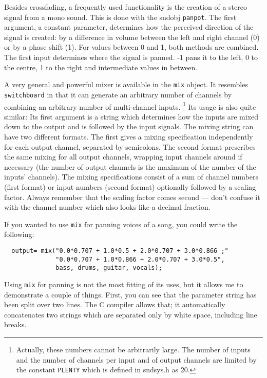 \documentclass{article}
\def\bv{\begin{verbatim}}
\begin{document}
Besides crossfading, a frequently used functionality is the creation of a
stereo signal from a mono sound.  This is done with the sndobj {\tt panpot}.
The first argument, a constant parameter, determines how the perceived
direction of the signal is created: by a difference in volume between the left
and right channel (0) or by a phase shift (1).  For values between 0 and 1,
both methods are combined.  The first input determines where the signal is
panned.  -1 pans it to the left, 0 to the centre, 1 to the right and
intermediate values in between.

A very general and powerful mixer is available in the {\tt mix} object.  It
resembles {\tt switchboard} in that it can generate an arbitrary number of
channels by combining an arbitrary number of multi-channel inputs.%
%
\footnote{Actually, these numbers cannot be arbitrarily large.  The
number of inputs and the number of channels per input and of output channels
are limited by the constant {\tt PLENTY} which is defined in sndsys.h as 20.}
%
Its usage is also quite similar:  Its first argument is a string which
determines how the inputs are mixed down to the output and is followed by the
input signals.  The mixing string can have two different formats.  The first
gives a mixing specification independently for each output channel, separated
by semicolons.  The second format prescribes the same mixing for all output
channels, wrapping input channels around if necessary (the number of output
channels is the maximum of the number of the inputs' channels).  The mixing
specifications consist of a sum of channel numbers (first format) or  input
numbers (second format) optionally followed by a scaling factor.  Always
remember that the scaling factor comes second --- don't confuse it with the
channel number which also looks like a decimal fraction.  

If you wanted to use {\tt mix} for panning voices of a song, you could write
the following:

\bv
  output= mix("0.0*0.707 + 1.0*0.5 + 2.0*0.707 + 3.0*0.866 ;"
              "0.0*0.707 + 1.0*0.866 + 2.0*0.707 + 3.0*0.5", 
              bass, drums, guitar, vocals);
\end{verbatim}

Using {\tt mix} for panning is not the most fitting of its uses, but it allows
me to demonstrate a couple of things.  First, you can see that the parameter string has been
split over two lines.  The C compiler allows that; it automatically
concatenates two strings which are separated only by white space, including
line breaks.
\end{document}

